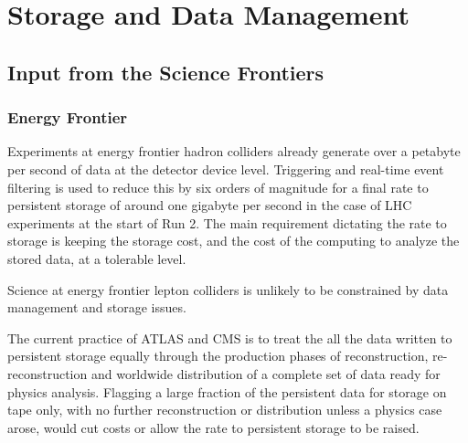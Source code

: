 
\chapter{Storage and Data Management}
\label{chap:mag}


\begin{center}\begin{boldmath}



\end{boldmath}\end{center}


\section{Input from the Science Frontiers}
\label{sec:cpfi5-input}
\subsection{Energy Frontier}
Experiments at energy frontier hadron colliders already generate over a petabyte per second of data at the detector device level.  Triggering and real-time event filtering is used to reduce this by six orders of magnitude for a final rate to persistent storage of around one gigabyte per second in the case of LHC experiments at the start of Run 2.  The main requirement dictating the rate to storage is keeping the storage cost, and the cost of the computing to analyze the stored data, at a tolerable level.

Science at energy frontier lepton colliders is unlikely to be constrained by data management and storage issues.

The current practice of ATLAS and CMS is to treat the all the data written to persistent storage equally through the production phases of reconstruction, re-reconstruction and worldwide distribution of a complete set of data ready for physics analysis.  Flagging a large fraction of the persistent data for storage on tape only, with no further reconstruction or distribution unless a physics case arose, would cut costs or allow the rate to persistent storage to be raised.

